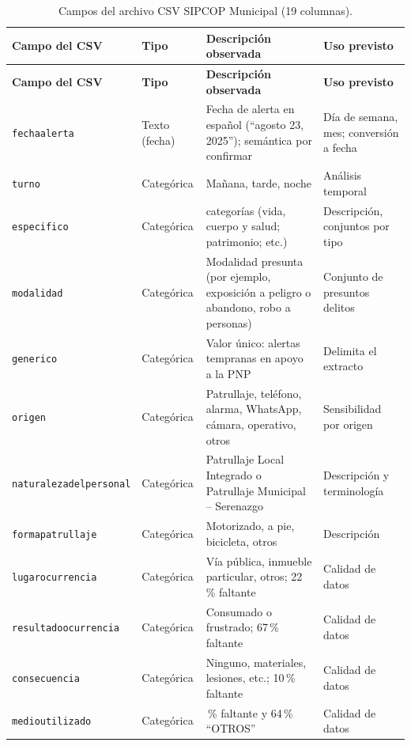 \label{anx:ficha}

\begingroup\singlespacing\footnotesize
\begin{longtable}{@{}p{4.0cm}>{\raggedright\arraybackslash}p{1.9cm}>{\raggedright\arraybackslash}p{5.3cm}>{\raggedright\arraybackslash}p{3.0cm}@{}}
\caption{Campos del archivo CSV SIPCOP Municipal (19 columnas).}\label{tab:ficha}\\
\toprule
\textbf{Campo del CSV} & \textbf{Tipo} & \textbf{Descripción observada} & \textbf{Uso previsto} \\
\midrule
\endfirsthead
\toprule
\textbf{Campo del CSV} & \textbf{Tipo} & \textbf{Descripción observada} & \textbf{Uso previsto} \\
\midrule
\endhead
\bottomrule
\endfoot
\texttt{fechaalerta} & Texto (fecha) & Fecha de alerta en español (``agosto 23, 2025''); semántica por confirmar & Día de semana, mes; conversión a fecha \\
\texttt{turno} & Categórica & Mañana, tarde, noche & Análisis temporal \\
\texttt{especifico} & Categórica & 8 categorías (vida, cuerpo y salud; patrimonio; etc.) & Descripción, conjuntos por tipo \\
\texttt{modalidad} & Categórica & Modalidad presunta (por ejemplo, exposición a peligro o abandono, robo a personas) & Conjunto de presuntos delitos \\
\texttt{generico} & Categórica & Valor único: alertas tempranas en apoyo a la PNP & Delimita el extracto \\
\texttt{origen} & Categórica & Patrullaje, teléfono, alarma, WhatsApp, cámara, operativo, otros & Sensibilidad por origen \\
\texttt{naturalezadelpersonal} & Categórica & Patrullaje Local Integrado o Patrullaje Municipal -- Serenazgo & Descripción y terminología \\
\texttt{formapatrullaje} & Categórica & Motorizado, a pie, bicicleta, otros & Descripción \\
\texttt{lugarocurrencia} & Categórica & Vía pública, inmueble particular, otros; 22\,\% faltante & Calidad de datos \\
\texttt{resultadoocurrencia} & Categórica & Consumado o frustrado; 67\,\% faltante & Calidad de datos \\
\texttt{consecuencia} & Categórica & Ninguno, materiales, lesiones, etc.; 10\,\% faltante & Calidad de datos \\
\texttt{medioutilizado} & Categórica & 32\,\% faltante y 64\,\% ``OTROS'' & Calidad de datos \\

\end{longtable}
